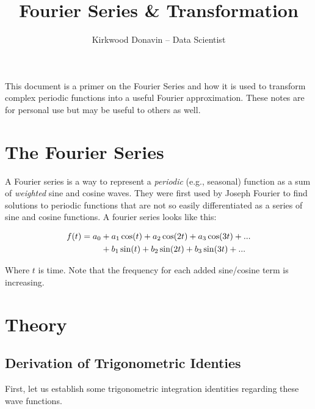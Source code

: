 \documentclass[10pt]{article} %
\title{Fourier Series \& Transformation} %
\author{Kirkwood Donavin -- Data Scientist} %
\date{} %
\begin{document}
\maketitle

This document is a primer on the Fourier Series and how it is used to transform complex periodic functions into a useful Fourier approximation. These notes are for personal use but may be useful to others as well.

\section*{The Fourier Series} %

A Fourier series is a way to represent a \textit{periodic} (e.g., seasonal) function as a sum of \textit{weighted} sine and cosine waves. They were first used by Joseph Fourier to find solutions to periodic functions that are not so easily differentiated as a series of sine and cosine functions. A fourier series looks like this:

\begin{align}
f(t) = a_0 & + a_1\cos(t) + a_2\cos(2t) + a_3\cos(3t) + ... \\
           & + b_1\sin(t) + b_2\sin(2t) + b_3\sin(3t) + ... \notag
\end{align}

Where $t$ is time. Note that the frequency for each added sine/cosine term is increasing.

\section*{Theory}

\subsection*{Derivation of Trigonometric Identies}

First, let us establish some trigonometric integration identities regarding these wave functions.
\end{document}
